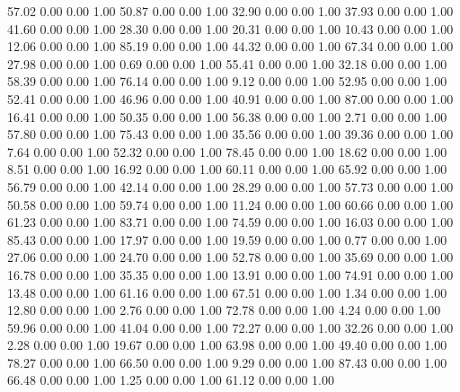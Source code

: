    57.02   0.00   0.00   1.00
   50.87   0.00   0.00   1.00
   32.90   0.00   0.00   1.00
   37.93   0.00   0.00   1.00
   41.60   0.00   0.00   1.00
   28.30   0.00   0.00   1.00
   20.31   0.00   0.00   1.00
   10.43   0.00   0.00   1.00
   12.06   0.00   0.00   1.00
   85.19   0.00   0.00   1.00
   44.32   0.00   0.00   1.00
   67.34   0.00   0.00   1.00
   27.98   0.00   0.00   1.00
    0.69   0.00   0.00   1.00
   55.41   0.00   0.00   1.00
   32.18   0.00   0.00   1.00
   58.39   0.00   0.00   1.00
   76.14   0.00   0.00   1.00
    9.12   0.00   0.00   1.00
   52.95   0.00   0.00   1.00
   52.41   0.00   0.00   1.00
   46.96   0.00   0.00   1.00
   40.91   0.00   0.00   1.00
   87.00   0.00   0.00   1.00
   16.41   0.00   0.00   1.00
   50.35   0.00   0.00   1.00
   56.38   0.00   0.00   1.00
    2.71   0.00   0.00   1.00
   57.80   0.00   0.00   1.00
   75.43   0.00   0.00   1.00
   35.56   0.00   0.00   1.00
   39.36   0.00   0.00   1.00
    7.64   0.00   0.00   1.00
   52.32   0.00   0.00   1.00
   78.45   0.00   0.00   1.00
   18.62   0.00   0.00   1.00
    8.51   0.00   0.00   1.00
   16.92   0.00   0.00   1.00
   60.11   0.00   0.00   1.00
   65.92   0.00   0.00   1.00
   56.79   0.00   0.00   1.00
   42.14   0.00   0.00   1.00
   28.29   0.00   0.00   1.00
   57.73   0.00   0.00   1.00
   50.58   0.00   0.00   1.00
   59.74   0.00   0.00   1.00
   11.24   0.00   0.00   1.00
   60.66   0.00   0.00   1.00
   61.23   0.00   0.00   1.00
   83.71   0.00   0.00   1.00
   74.59   0.00   0.00   1.00
   16.03   0.00   0.00   1.00
   85.43   0.00   0.00   1.00
   17.97   0.00   0.00   1.00
   19.59   0.00   0.00   1.00
    0.77   0.00   0.00   1.00
   27.06   0.00   0.00   1.00
   24.70   0.00   0.00   1.00
   52.78   0.00   0.00   1.00
   35.69   0.00   0.00   1.00
   16.78   0.00   0.00   1.00
   35.35   0.00   0.00   1.00
   13.91   0.00   0.00   1.00
   74.91   0.00   0.00   1.00
   13.48   0.00   0.00   1.00
   61.16   0.00   0.00   1.00
   67.51   0.00   0.00   1.00
    1.34   0.00   0.00   1.00
   12.80   0.00   0.00   1.00
    2.76   0.00   0.00   1.00
   72.78   0.00   0.00   1.00
    4.24   0.00   0.00   1.00
   59.96   0.00   0.00   1.00
   41.04   0.00   0.00   1.00
   72.27   0.00   0.00   1.00
   32.26   0.00   0.00   1.00
    2.28   0.00   0.00   1.00
   19.67   0.00   0.00   1.00
   63.98   0.00   0.00   1.00
   49.40   0.00   0.00   1.00
   78.27   0.00   0.00   1.00
   66.50   0.00   0.00   1.00
    9.29   0.00   0.00   1.00
   87.43   0.00   0.00   1.00
   66.48   0.00   0.00   1.00
    1.25   0.00   0.00   1.00
   61.12   0.00   0.00   1.00
